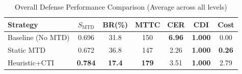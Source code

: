 \begin{table}[!t]
\centering
\caption{Overall Defense Performance Comparison (Average across all levels)}
\label{tab:overall_performance}
\renewcommand{\arraystretch}{1.1}
\begin{tabular}{@{}lcccccc@{}}
\toprule
\textbf{Strategy} & $S_{\mathrm{MTD}}$ & \textbf{BR(\%)} & \textbf{MTTC} & \textbf{CER} & \textbf{CDI} & \textbf{Cost} \\
\midrule
Baseline (No MTD) & 0.696 & 31.8 & 150 & \textbf{6.96} & \textbf{1.000} & 0.00 \\
Static MTD & 0.672 & 36.8 & 147 & 2.26 & \textbf{1.000} & \textbf{0.26} \\
Heuristic+CTI & \textbf{0.784} & \textbf{17.4} & \textbf{179} & 3.51 & \textbf{1.000} & 2.79 \\
\bottomrule
\end{tabular}
\end{table}
